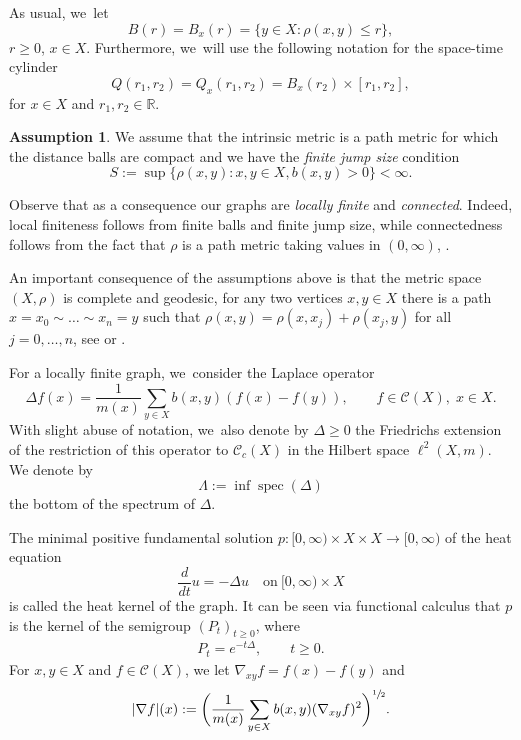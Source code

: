 \documentclass[10pt]{amsart}
\theoremstyle{plain}
\theoremstyle{definition}
\newtheorem{assumption}[theorem]{Assumption}
\newcommand{\RR}{\mathbb{R}}
\newcommand{\cC}{\mathcal{C}}
\DeclareMathOperator{\spec}{spec}
\begin{document}
As usual, we~let
\[
B(r)= B_x(r)=\{y\in X: \rho(x,y)\leq r\},
\]
$r\geq 0 $, $x\in X$. Furthermore, we~will use the following notation for the space-time cylinder
\[
{Q(r_1,r_2)}=Q_x(r_1,r_2)=B_x(r_2)\times [r_1,r_2],
\]
for $ x\in X $ and $ r_1,r_2\in\RR$.

\begin{assumption}\label{assumption2} We assume that the intrinsic metric is a path metric for which the distance balls are compact and we have the \emph{finite jump size} condition
\[
S:=\sup\{\rho(x,y)\colon x,y\in X, b(x,y)>0\}<\infty.
\]
\end{assumption}

Observe that as a consequence our graphs are \emph{locally finite} and \emph{connected}. Indeed, local finiteness follows from finite balls and finite jump size, while connectedness follows from the fact that $ \rho $ is a path metric taking values in $ (0,\infty) $, \cf \cite{KellerLW-21}.

An important consequence of the assumptions above is that the metric space $ (X,\rho) $ is complete and geodesic, \ie for any two vertices $ x,y\in X $ there is a path $x= x_{0}\sim\ldots \sim x_{n}=y $ such that $ \rho(x,y)=\rho(x,x_{j})+\rho(x_{j},y) $ for all $ j=0,\ldots,n $, see \cite[Ch.\,11.2]{KellerLW-21} or \cite{KellerMuench}.

{For a locally finite graph, we~consider the {Laplace} operator
\[
\Delta f(x)= \frac{1}{m(x)}\sum_{y\in X}b(x,y)(f(x)-f(y)),\qquad f\in \mathcal{C}(X),\;x\in X.
\]
With slight abuse of notation, we~{also} denote by $ \Delta\geq0 $ the Friedrichs extension of the restriction of this operator to $ \mathcal{C}_{c}(X) $} in the Hilbert space $\ell^2(X,m)$. We denote by
\[
\Lambda:=\inf\spec(\Delta)
\]
the bottom of the spectrum of $\Delta$.

The minimal positive fundamental solution $p\colon [0,\infty)\times X\times X\to [0,\infty)$ of the heat equation
\[
\frac{d}{dt}u=-\Delta u \quad \text{on}\ [0,\infty)\times X
\]
is called the heat kernel of the graph. It can be seen via functional calculus that $ p $ is the kernel of the semigroup $(P_t)_{t\geq0}$, where
\begin{align*}
P_{t}=e^{-t\Delta},\qquad t\ge0.
\end{align*}
For $ x,y\in X $ and $ f\in\cC(X) $, {we let $ \nabla_{xy}f=f(x)-f(y) $ and}
\[
\vert \nabla f\vert(x):=\biggl(\frac{1}{m(x)}\sum_{y\in X}b(x,y) (\nabla_{xy}f)^2\biggr)^{\sfrac12}.
\]
\end{document}
